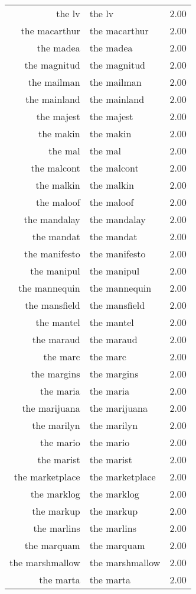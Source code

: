 \begin{table}[ht]
\begin{tabular}{rlr}
  the lv & the lv & 2.00 \\ 
  the macarthur & the macarthur & 2.00 \\ 
  the madea & the madea & 2.00 \\ 
  the magnitud & the magnitud & 2.00 \\ 
  the mailman & the mailman & 2.00 \\ 
  the mainland & the mainland & 2.00 \\ 
  the majest & the majest & 2.00 \\ 
  the makin & the makin & 2.00 \\ 
  the mal & the mal & 2.00 \\ 
  the malcont & the malcont & 2.00 \\ 
  the malkin & the malkin & 2.00 \\ 
  the maloof & the maloof & 2.00 \\ 
  the mandalay & the mandalay & 2.00 \\ 
  the mandat & the mandat & 2.00 \\ 
  the manifesto & the manifesto & 2.00 \\ 
  the manipul & the manipul & 2.00 \\ 
  the mannequin & the mannequin & 2.00 \\ 
  the mansfield & the mansfield & 2.00 \\ 
  the mantel & the mantel & 2.00 \\ 
  the maraud & the maraud & 2.00 \\ 
  the marc & the marc & 2.00 \\ 
  the margins & the margins & 2.00 \\ 
  the maria & the maria & 2.00 \\ 
  the marijuana & the marijuana & 2.00 \\ 
  the marilyn & the marilyn & 2.00 \\ 
  the mario & the mario & 2.00 \\ 
  the marist & the marist & 2.00 \\ 
  the marketplace & the marketplace & 2.00 \\ 
  the marklog & the marklog & 2.00 \\ 
  the markup & the markup & 2.00 \\ 
  the marlins & the marlins & 2.00 \\ 
  the marquam & the marquam & 2.00 \\ 
  the marshmallow & the marshmallow & 2.00 \\ 
  the marta & the marta & 2.00 \\ 

\end{tabular}
\end{table}

